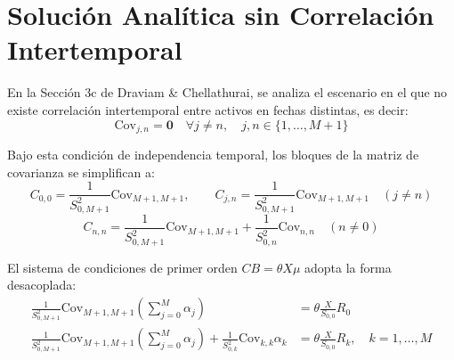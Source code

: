 \documentclass[11pt,a4paper]{report}
\numberwithin{equation}{chapter}
\begin{document}
\section{Solución Analítica sin Correlación Intertemporal}

En la Sección 3c de Draviam \& Chellathurai, se analiza el escenario en el que no existe correlación intertemporal entre activos en fechas distintas, es decir:
\begin{equation}
    \mathrm{Cov}_{j,n} = \mathbf{0} \quad \forall j \neq n, \quad j,n \in \{1, \dots, M+1\}
\end{equation}

Bajo esta condición de independencia temporal, los bloques de la matriz de covarianza se simplifican a:
\begin{equation}
    C_{0,0} = \frac{1}{S_{0,M+1}^2} \mathrm{Cov}_{M+1,M+1}, \qquad C_{j,n} = \frac{1}{S_{0,M+1}^2} \mathrm{Cov}_{M+1,M+1} \quad (j \neq n)
\end{equation}
\begin{equation}
    C_{n,n} = \frac{1}{S_{0,M+1}^2} \mathrm{Cov}_{M+1,M+1} + \frac{1}{S_{0,n}^2} \mathrm{Cov}_{n,n} \quad (n \neq 0)
\end{equation}

El sistema de condiciones de primer orden $CB = \theta X \mu$ adopta la forma desacoplada:
\begin{align}
    \frac{1}{S_{0,M+1}^2} \mathrm{Cov}_{M+1,M+1} \left( \sum_{j=0}^M \alpha_j \right) &= \theta \frac{X}{S_{0,0}} R_0 \label{eq:indep_0} \\
    \frac{1}{S_{0,M+1}^2} \mathrm{Cov}_{M+1,M+1} \left( \sum_{j=0}^M \alpha_j \right) + \frac{1}{S_{0,k}^2} \mathrm{Cov}_{k,k} \alpha_k &= \theta \frac{X}{S_{0,0}} R_k, \quad k = 1, \dots, M \label{eq:indep_k}
\end{align}
\end{document}
